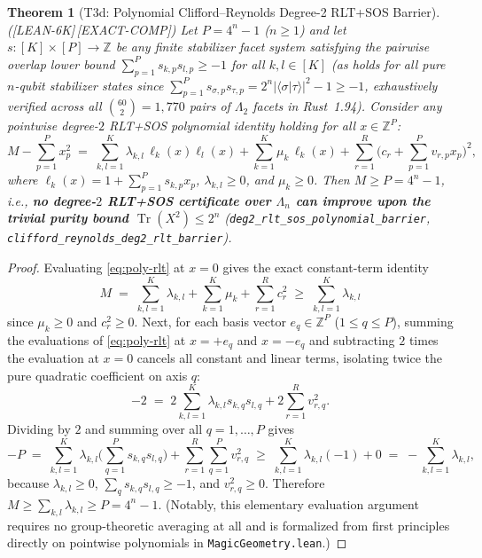 \documentclass[11pt,reqno]{amsart}
\newtheorem{theorem}{Theorem}[section]
\theoremstyle{definition}
\newcommand{\ZZ}{\mathbb{Z}}
\newcommand{\Tr}{\operatorname{Tr}}
\newcommand{\lid}[1]{{\footnotesize\nolinkurl{#1}}}
\newcommand{\tagL}{\textsf{\footnotesize[LEAN-6K]}}
\newcommand{\tagE}{\textsf{\footnotesize[EXACT-COMP]}}
\begin{document}
\begin{theorem}[T3d: Polynomial Clifford--Reynolds Degree-2 RLT+SOS Barrier]
\label{thm:t3d}
\textup{(\tagL\,\tagE)}
Let $P = 4^n - 1$ ($n \ge 1$) and let $s : [K] \times [P] \to \ZZ$ be any finite
stabilizer facet system satisfying the pairwise overlap lower bound
$\sum_{p=1}^P s_{k,p} s_{l,p} \ge -1$ for all $k, l \in [K]$ (as holds for all pure
$n$-qubit stabilizer states since $\sum_{p=1}^P s_{\sigma,p} s_{\tau,p} =
2^n|\langle\sigma|\tau\rangle|^2 - 1 \ge -1$, exhaustively verified across all
$\binom{60}{2} = 1{,}770$ pairs of $\Lambda_2$ facets in Rust~1.94). Consider any
pointwise degree-$2$ RLT+SOS polynomial identity holding for all $x \in \ZZ^P$:
\begin{equation}
  \label{eq:poly-rlt}
  M - \sum_{p=1}^P x_p^2
  \;=\; \sum_{k,l=1}^K \lambda_{k,l}\,\ell_k(x)\ell_l(x)
        + \sum_{k=1}^K \mu_k\,\ell_k(x)
        + \sum_{r=1}^R \Big(c_r + \sum_{p=1}^P v_{r,p} x_p\Big)^2,
\end{equation}
where $\ell_k(x) = 1 + \sum_{p=1}^P s_{k,p} x_p$, $\lambda_{k,l} \ge 0$, and
$\mu_k \ge 0$. Then $M \ge P = 4^n - 1$, i.e., \textbf{no degree-$2$ RLT+SOS certificate
over $\Lambda_n$ can improve upon the trivial purity bound $\Tr(X^2) \le 2^n$}
(\lid{deg2_rlt_sos_polynomial_barrier}, \lid{clifford_reynolds_deg2_rlt_barrier}).
\end{theorem}

\begin{proof}
Evaluating \eqref{eq:poly-rlt} at $x = 0$ gives the exact constant-term identity
\[
  M \;=\; \sum_{k,l=1}^K \lambda_{k,l} + \sum_{k=1}^K \mu_k + \sum_{r=1}^R c_r^2
  \;\ge\; \sum_{k,l=1}^K \lambda_{k,l}
\]
since $\mu_k \ge 0$ and $c_r^2 \ge 0$. Next, for each basis vector $e_q \in \ZZ^P$
($1 \le q \le P$), summing the evaluations of \eqref{eq:poly-rlt} at $x = +e_q$ and
$x = -e_q$ and subtracting $2$ times the evaluation at $x = 0$ cancels all constant and
linear terms, isolating twice the pure quadratic coefficient on axis $q$:
\[
  -2 \;=\; 2\sum_{k,l=1}^K \lambda_{k,l} s_{k,q} s_{l,q} + 2\sum_{r=1}^R v_{r,q}^2.
\]
Dividing by $2$ and summing over all $q = 1, \dots, P$ gives
\[
  -P \;=\; \sum_{k,l=1}^K \lambda_{k,l} \Big(\sum_{q=1}^P s_{k,q} s_{l,q}\Big)
         + \sum_{r=1}^R \sum_{q=1}^P v_{r,q}^2
     \;\ge\; \sum_{k,l=1}^K \lambda_{k,l}(-1) + 0
     \;=\; -\sum_{k,l=1}^K \lambda_{k,l},
\]
because $\lambda_{k,l} \ge 0$, $\sum_q s_{k,q} s_{l,q} \ge -1$, and $v_{r,q}^2 \ge 0$.
Therefore $M \ge \sum_{k,l} \lambda_{k,l} \ge P = 4^n - 1$. (Notably, this elementary
evaluation argument requires no group-theoretic averaging at all and is formalized from
first principles directly on pointwise polynomials in \lid{MagicGeometry.lean}.)
\end{proof}
\end{document}
